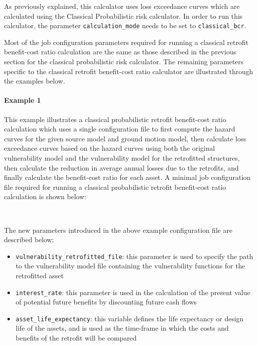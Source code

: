 As previously explained, this calculator uses loss exceedance curves which are
calculated using the Classical Probabilistic risk calculator. In order to run
this calculator, the parameter \Verb+calculation_mode+ needs to be set to
\Verb+classical_bcr+.

Most of the job configuration parameters required for running a classical
retrofit benefit-cost ratio calculation are the same as those described in the
previous section for the classical probabilistic risk calculator. The
remaining parameters specific to the classical retrofit benefit-cost ratio
calculator are illustrated through the examples below.

\paragraph{Example 1}

This example illustrates a classical probabilistic retrofit benefit-cost ratio
calculation which uses a single configuration file to first compute the hazard
curves for the given source model and ground motion model, then calculate loss
exceedance curves based on the hazard curves using both the original
vulnerability model and the vulnerability model for the retrofitted
structures, then calculate the reduction in average annual losses due to the
retrofits, and finally calculate the benefit-cost ratio for each asset. A
minimal job configuration file required for running a classical probabilistic
retrofit benefit-cost ratio calculation is shown below:

\inputminted[firstline=1,firstnumber=1,fontsize=\footnotesize,frame=single,linenos,bgcolor=lightgray,label=job.ini]{ini}{oqum/risk/verbatim/config_classical_bcr_combined.ini}\\

The new parameters introduced in the above example configuration file are
described below:

\begin{itemize}

  \item \Verb+vulnerability_retrofitted_file+: this parameter is used to
    specify the path to the \gls{vulnerability model} file containing the
    \glspl{vulnerability function} for the retrofitted asset

  \item \Verb+interest_rate+: this parameter is used in the calculation of the
    present value of potential future benefits by discounting future cash flows

  \item \Verb+asset_life_expectancy+: this variable defines the life
    expectancy or design life of the assets, and is used as the time-frame in
    which the costs and benefits of the retrofit will be compared

\end{itemize}

